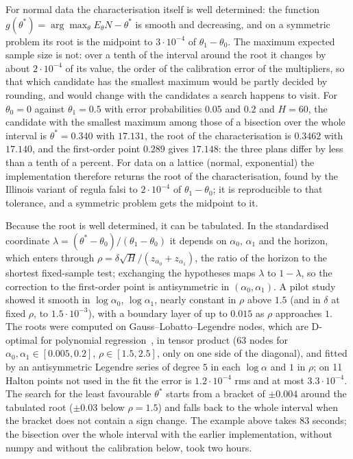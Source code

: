 \documentclass[11pt,a4paper]{article}
\theoremstyle{definition}
\theoremstyle{remark}
\begin{document}
For normal data the characterisation itself is well determined: the
function $g(\theta^*)=\arg\max_\theta E_\theta N-\theta^*$ is smooth and
decreasing, and on a symmetric problem its root is the midpoint to
$3\cdot10^{-4}$ of $\theta_1-\theta_0$. The maximum expected sample size
is not: over a tenth of the interval around the root it changes by about
$2\cdot10^{-4}$ of its value, the order of the calibration error of the
multipliers, so that which candidate has the smallest maximum would be
partly decided by rounding, and would change with the candidates a search
happens to visit. For $\theta_0=0$ against $\theta_1=0.5$ with error
probabilities $0.05$ and $0.2$ and $H=60$, the candidate with the smallest
maximum among those of a bisection over the whole interval is
$\theta^*=0.340$ with $17.131$, the root of the characterisation is
$0.3462$ with $17.140$, and the first-order point $0.289$ gives $17.148$:
the three plans differ by less than a tenth of a percent. For data on a
lattice (normal, exponential) the implementation therefore returns the
root of the characterisation, found by the Illinois variant of regula
falsi to $2\cdot10^{-4}$ of $\theta_1-\theta_0$; it is reproducible to that
tolerance, and a symmetric problem gets the midpoint to it.

Because the root is well determined, it can be tabulated. In the
standardised coordinate $\lambda=(\theta^*-\theta_0)/(\theta_1-\theta_0)$
it depends on $\alpha_0$, $\alpha_1$ and the horizon, which enters
through $\rho=\delta\sqrt H/(z_{\alpha_0}+z_{\alpha_1})$, the ratio of the
horizon to the shortest fixed-sample test; exchanging the hypotheses maps
$\lambda$ to $1-\lambda$, so the correction to the first-order point is
antisymmetric in $(\alpha_0,\alpha_1)$. A pilot study showed it smooth in
$\log\alpha_0$, $\log\alpha_1$, nearly constant in $\rho$ above $1.5$
(and in $\delta$ at fixed $\rho$, to $1.5\cdot10^{-3}$), with a boundary
layer of up to $0.015$ as $\rho$ approaches $1$. The roots were computed
on Gauss--Lobatto--Legendre nodes, which are D-optimal for polynomial
regression~\cite{guest1958}, in tensor product (63 nodes for $\alpha_0,\alpha_1\in[0.005,
0.2]$, $\rho\in[1.5,2.5]$, only on one side of the diagonal), and fitted
by an antisymmetric Legendre series of degree $5$ in each $\log\alpha$
and $1$ in $\rho$; on 11 Halton points not used in the fit the error is
$1.2\cdot10^{-4}$ rms and at most $3.3\cdot10^{-4}$. The search for the
least favourable $\theta^*$ starts from a bracket of $\pm0.004$ around
the tabulated root ($\pm0.03$ below $\rho=1.5$) and falls back to the
whole interval when the bracket does not contain a sign change. The
example above takes 83 seconds; the bisection over the whole interval
with the earlier implementation, without numpy and without the
calibration below, took two hours.
\end{document}
